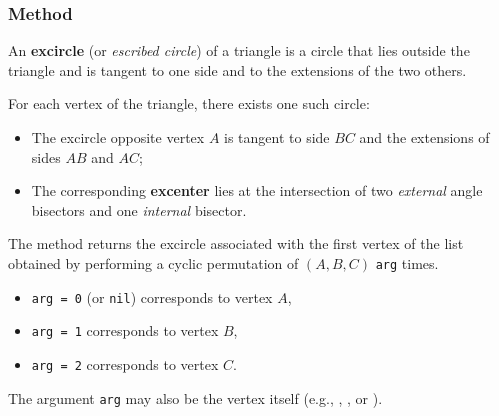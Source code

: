\subsubsection{Method } %
\label{ssub:method_triangle_ex__circle}

An \textbf{excircle} (or \emph{escribed circle}) of a triangle is a circle that lies outside the triangle and is tangent to one side and to the extensions of the two others.

\medskip

For each vertex of the triangle, there exists one such circle:
\begin{itemize}
  \item The excircle opposite vertex $A$ is tangent to side $BC$ and the extensions of sides $AB$ and $AC$;
  \item The corresponding \textbf{excenter} lies at the intersection of two \emph{external} angle bisectors and one \emph{internal} bisector.
\end{itemize}


The method  returns the excircle
associated with the first vertex of the list obtained by performing
a cyclic permutation of $(A,B,C)$ \verb|arg| times.

\begin{itemize}
  \item \verb|arg = 0| (or \verb|nil|) corresponds to vertex $A$,
  \item \verb|arg = 1| corresponds to vertex $B$,
  \item \verb|arg = 2| corresponds to vertex $C$.
\end{itemize}

The argument \verb|arg| may also be the vertex itself (e.g., , , or ).

\vspace{1em}

